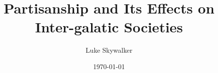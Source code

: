 

\title{Partisanship and Its Effects on Inter-galatic Societies}
\author{Luke Skywalker}
\date{\today}

\doublespacing

  
  
  
  {\hypersetup{linkcolor=black}
    \setcounter{secnumdepth}{4}
    
    \setcounter{tocdepth}{3}
    
    \tableofcontents
    \listoffigures
  }

  \setlength{\parindent}{1em}
  \setlength{\parskip}{0em}

  \newpage
  
  
  
  \printbibliography


